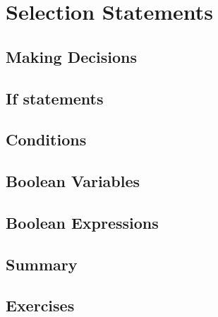 \chapter{Selection Statements}

\section{Making Decisions}



\section{If statements}



\section{Conditions}


\section{Boolean Variables}


\section{Boolean Expressions}

\section{Summary}


\section{Exercises}

